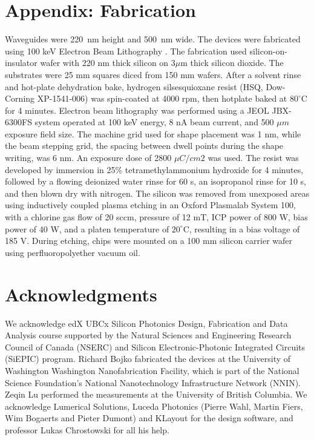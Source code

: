 \documentclass[10pt]{article}
\begin{document}
\section*{Appendix: Fabrication}
\label{sec:appendix}
Waveguides were 220~nm height and 500~nm wide. The devices were fabricated using 100 keV Electron Beam Lithography \cite{Bojko2011}. The fabrication used silicon-on-insulator wafer with 220 nm thick silicon on 3$\mu$m thick silicon dioxide. The substrates were 25 mm squares diced from 150 mm wafers. After a solvent rinse and hot-plate dehydration bake, hydrogen silsesquioxane resist (HSQ, Dow-Corning XP-1541-006) was spin-coated at 4000 rpm, then hotplate baked at $80^\circ$C for 4 minutes. Electron beam lithography was performed using a JEOL JBX-6300FS system operated at 100 keV energy, 8 nA beam current, and 500 $\mu m$ exposure field size. The machine grid used for shape placement was 1 nm, while the beam stepping grid, the spacing between dwell points during the shape writing, was 6 nm. An exposure dose of 2800 $\mu C/cm2$ was used. The resist was developed by immersion in 25\% tetramethylammonium hydroxide for 4 minutes, followed by a flowing deionized water rinse for 60 s, an isopropanol rinse for 10 s, and then blown dry with nitrogen. The silicon was removed from unexposed areas using inductively coupled plasma etching in an Oxford Plasmalab System 100, with a chlorine gas flow of 20 sccm, pressure of 12 mT, ICP power of 800 W, bias power of 40 W, and a platen temperature of $20^\circ$C, resulting in a bias voltage of 185 V. During etching, chips were mounted on a 100 mm silicon carrier wafer using perfluoropolyether vacuum oil. 

\section*{Acknowledgments}
We acknowledge edX UBCx Silicon Photonics Design, Fabrication and Data Analysis course supported by the Natural Sciences and Engineering Research Council of Canada (NSERC) and Silicon Electronic-Photonic Integrated Circuits (SiEPIC) program.
Richard Bojko fabricated the devices at the University of Washington Washington Nanofabrication Facility, which is part of the National Science Foundation's National Nanotechnology Infrastructure Network (NNIN).
Zeqin Lu performed the measurements at the University of British Columbia.
We acknowledge Lumerical Solutions, Luceda Photonics (Pierre Wahl, Martin Fiers, Wim Bogaerts and Pieter Dumont) and KLayout for the design software, and professor Lukas Chrostowski for all his help.
\end{document}
